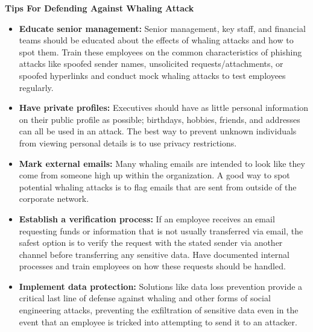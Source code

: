 \documentclass[15pt]{article}
\begin{document}
 \begin{Large}  \begin{center}
 \textbf{Tips For Defending Against Whaling Attack }
 \end{center} \end{Large} 
 \begin{itemize}
  \item \textbf{Educate senior management:} Senior management, key staff, and financial teams should be educated about the effects of whaling attacks and how to spot them. Train these employees on the common characteristics of phishing attacks like spoofed sender names, unsolicited requests/attachments, or spoofed hyperlinks and conduct mock whaling attacks to test employees regularly.
  
  \item \textbf{Have private profiles:} Executives should have as little personal information on their public profile as possible; birthdays, hobbies, friends, and addresses can all be used in an attack. The best way to prevent unknown individuals from viewing personal details is to use privacy restrictions.
  
  \item \textbf{Mark external emails:} Many whaling emails are intended to look like they come from someone high up within the organization. A good way to spot potential whaling attacks is to flag emails that are sent from outside of the corporate network.
  \item \textbf{Establish a verification process:} If an employee receives an email requesting funds or information that is not usually transferred via email, the safest option is to verify the request with the stated sender via another channel before transferring any sensitive data. Have documented internal processes and train employees on how these requests should be handled.
  \item \textbf{Implement data protection:} Solutions like data loss prevention provide a critical last line of defense against whaling and other forms of social engineering attacks, preventing the exfiltration of sensitive data even in the event that an employee is tricked into attempting to send it to an attacker.
  
 \end{itemize}
 
\end{document}
